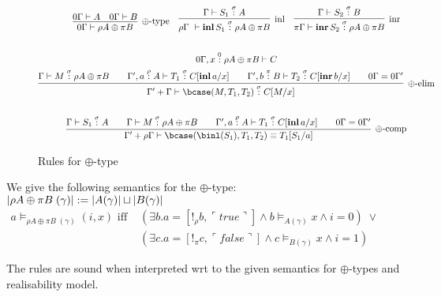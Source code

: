 \documentclass[12pt,a4paper]{article}
\begin{document}
\begin{figure}[h]
\begin{gather*}
  \begin{align*}
    \infer[\oplus\text{-type}]{0\Gamma \vdash \rho A \oplus \pi B}{
      0\Gamma \vdash A &
      0\Gamma \vdash B} & & 
    \infer[\text{inl}]{\rho \Gamma \ \vdash \mathbf{inl}\, S_1 \of \sigma \rho A \oplus \pi B}{
      \Gamma \vdash S_1 \of{\sigma} A} & &
    \infer[\text{inr}]{\pi\Gamma \vdash \mathbf{inr}\, S_2 \of \sigma \rho A \oplus \pi B}{
      \Gamma \vdash S_2 \of{\sigma} B
    }
  \end{align*}\\
  \\
  0\Gamma, x \of{0} \rho A \oplus \pi B \vdash C \\
  \infer[\oplus \text{-elim}]{\Gamma' + \Gamma \vdash \bcase(M , T_1 , T_2)\of{ \sigma}C[M/x]}{
    \Gamma \vdash M \of{\sigma} \rho A \oplus \pi B &&
    \Gamma', a \of {\rho} A \vdash T_1 \of{\sigma} C[\mathbf{inl}\, a/x] && 
    \Gamma', b \of{\pi} B \vdash T_2 \of{\sigma} C[\mathbf{inr}\, b/x] &&
    0\Gamma = 0\Gamma'    
  }\\
  \\
  \infer[\oplus \text{-comp}]{\Gamma' + \rho\Gamma \vdash \bcase(\binl(S_1), T_1, T_2) \equiv T_1[S_1 / a]}{
    \Gamma \vdash S_1 \of{\sigma} A &&
    \Gamma \vdash M \of{\sigma} \rho A \oplus \pi B &&
    \Gamma', a \of {\rho} A \vdash T_1 \of{\sigma} C[\mathbf{inl}\, a/x] && 
    0\Gamma = 0\Gamma'    
  }\\
\end{gather*}
\caption{Rules for $\oplus$-type}
\end{figure}
We give the following semantics for the $\oplus$-type:\\
$|\rho A \oplus \pi B\;(\gamma)| := |A(\gamma)| \sqcup |B(\gamma)|$\\
$\begin{aligned}
  a \vDash_{\rho A \oplus \pi B\;(\gamma)} (i , x) \text{ iff } &(\exists b .  a =[!_\rho b, \ulcorner true \urcorner] \land b \vDash_{A(\gamma)} x \land i = 0)\; \lor \\
  &(\exists c .  a =[!_\pi c, \ulcorner false \urcorner] \land c \vDash_{B(\gamma)} x \land i = 1)
\end{aligned}$
\begin{claim}
  The rules are sound when interpreted wrt to the given semantics for $\oplus$-types and realisability model.
\end{claim}
\end{document}
